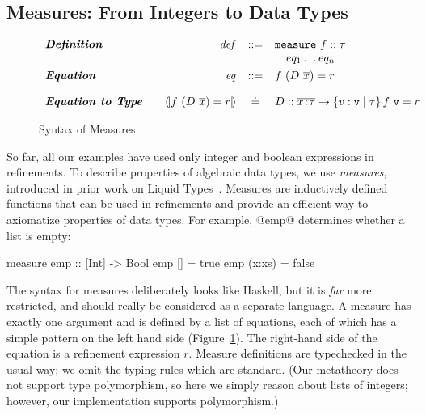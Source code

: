 \newcommand\hnull{\ensuremath{\text{[]}}\xspace}

\subsection{Measures: From Integers to Data Types}\label{sec:measures}

\begin{figure}
\centering
\captionsetup{justification=centering}
$$
\begin{array}{lrcl}
{\emphbf{Definition}} &
  \mathit{def} & ::=  &  \mathtt{measure} \ f :: \tau \\
              & &      &  \quad eq_1 \ldots eq_n       \\[0.05in]

{\emphbf{Equation}}   & 
  \mathit{eq}  & ::=  &   f\ (D\ \overline{x}) = r    \\[0.15in] 

{\emphbf{Equation to Type}} &
\quad \embed{f\ (D\ \overline{x}) = r} & \defeq & D :: \overline{\tbind{x}{\tau}} \rightarrow \tref{\mathtt{v}}{\tau}{}{f\ \mathtt{v} = r}
\end{array}
$$
\caption{Syntax of Measures.}
\label{fig:measures}
\end{figure}



So far, all our examples have used only integer and boolean expressions in refinements.
To describe properties of algebraic data types, we use \emph{measures},
introduced in prior work on Liquid Types~\cite{LiquidPLDI09}.
%
Measures are inductively defined functions that can be used in refinements and
provide an efficient way to axiomatize properties of data types.
%
For example, @emp@ determines whether a list is empty:
%
\begin{code}
  measure emp  :: [Int] -> Bool
    emp []     = true
    emp (x:xs) = false
\end{code}
The syntax for measures deliberately looks like Haskell, but it is \emph{far} more
restricted, and should really be considered as a separate language.
A measure has exactly one argument and is defined by a list of equations,
each of which has a simple pattern on the left hand side (Figure~\ref{fig:measures}).
The right-hand side of the equation is a refinement expression $r$.
Measure definitions are typechecked in the usual way; we omit the typing rules which are standard.
(Our metatheory does not support type polymorphism,
so here we simply reason about lists of integers;
however, our implementation supports polymorphism.)

